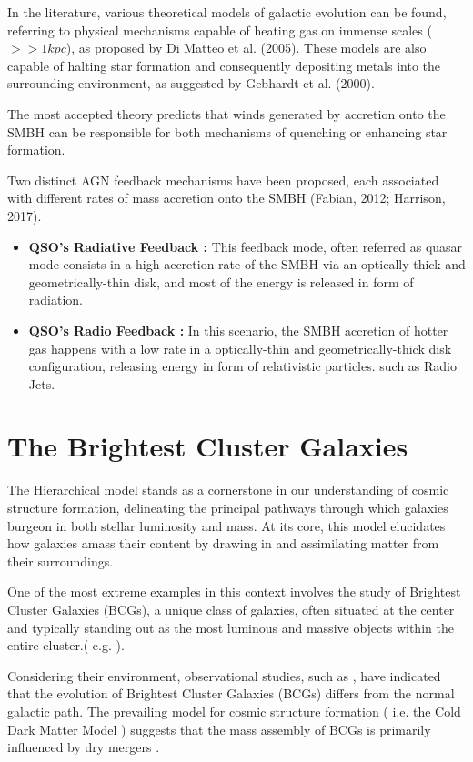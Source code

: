In the literature, various theoretical models of galactic evolution can be found, referring to physical mechanisms capable of heating gas on immense scales ($>> 1 kpc$), as proposed by Di Matteo et al. (2005). These models are also capable of halting star formation and consequently depositing metals into the surrounding environment, as suggested by Gebhardt et al. (2000).

The most accepted theory predicts that winds generated by accretion onto the SMBH can be responsible for both mechanisms of quenching or enhancing star formation.

Two distinct AGN feedback mechanisms have been proposed, each associated with different rates of mass accretion onto the SMBH (Fabian, 2012; Harrison, 2017).
\begin{itemize}
	\item \textbf{QSO's Radiative Feedback :} This feedback mode, often referred as quasar mode consists in a high accretion 		rate of the SMBH via an optically-thick and geometrically-thin disk, and most of the energy is released in form of radiation.
	\item \textbf{QSO's Radio Feedback :} In this scenario, the SMBH accretion of hotter gas happens with a low rate in a optically-thin and geometrically-thick disk configuration, releasing energy in form of relativistic particles. such as Radio Jets.
\end{itemize}




\section{The Brightest Cluster Galaxies }
The Hierarchical model stands as a cornerstone in our understanding of cosmic structure formation, delineating the principal pathways through which galaxies burgeon in both stellar luminosity and mass. At its core, this model elucidates how galaxies amass their content by drawing in and assimilating matter from their surroundings.

One of the most extreme examples in this context involves the study of Brightest Cluster Galaxies (BCGs), a unique class of galaxies, often situated at the center and typically standing out as the most luminous and massive objects within the entire cluster.( e.g. \cite{2015MNRAS.448....2W} ).

Considering their environment, observational studies, such as \cite{2020MNRAS.498.2719T}, have indicated that the evolution of Brightest Cluster Galaxies (BCGs) differs from the normal galactic path. The prevailing model for cosmic structure formation ( i.e. the Cold Dark Matter Model ) suggests that the mass assembly of BCGs is primarily influenced by dry mergers \cite{2007MNRAS.375....2D, 2019ApJ...881..150C}.

